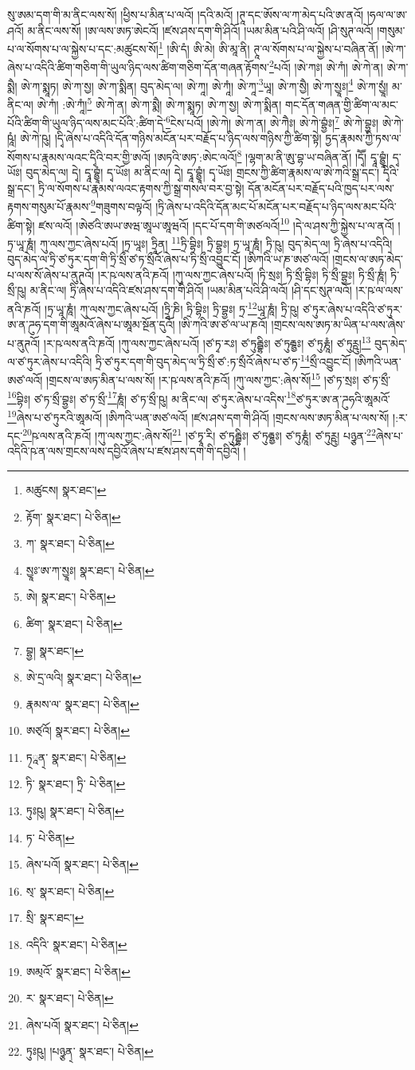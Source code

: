 སུ་ཨམ་དག་གི་མ་ནིང་ལས་སོ། །ཕྱིས་པ་མིན་པ་ལའོ། །དའི་མའོ། །ཊཱ་དང་ཨོས་ལ་ཀ་མེད་པའི་ཨ་ནའོ། །ཧལ་ལ་ཨ་ཤའོ། མ་ནིང་ལས་སོ། །ཨ་ལས་ཨཏ་ཨེངའོ། །ཛས་ཤས་དག་གི་ཤིའོ། །ཡམ་མིན་པའི་ཤི་ལའོ། །ཤི་སུཊ་ལའོ། །གསུམ་པ་ལ་སོགས་པ་ལ་སྐྱེས་པ་དང་:མཚུངས་སོ།\footnote{མཚུངས།  སྣར་ཐང་། } །ཨི་དཾ། ཨི་མེ། ཨི་མཱ་ནི། ཊཱ་ལ་སོགས་པ་ལ་སྐྱེས་པ་བཞིན་ནོ། །ཨེ་ཀ་ཞེས་པ་འདིའི་ཚིག་གཅིག་གི་ཡུལ་ཉིད་ལས་ཚིག་གཅིག་དོན་གཞན་རྟོགས་\footnote{རྟོག་  སྣར་ཐང་།  པེ་ཅིན། }པའོ། །ཨེ་ཀཿ། ཨེ་ཀཾ། ཨེ་ཀེ་ན། ཨེ་ཀ་སྨཻ། ཨེ་ཀ་སྨཱཏ། ཨེ་ཀ་སྱ། ཨེ་ཀ་སྨིན། བུད་མེད་ལ། ཨེ་ཀཱ། ཨེ་ཀཱཾ། ཨེ་ཀཱ་\footnote{ཀ་  སྣར་ཐང་།  པེ་ཅིན། }ཡཱ། ཨེ་ཀ་སྱཻ། ཨེ་ཀ་སྱཱཿ།\footnote{སྱཱཿ་ཨ་ཀ་སྱཱཿ།  སྣར་ཐང་།  པེ་ཅིན། } ཨེ་ཀ་སྱཱཾ། མ་ནིང་ལ། ཨེ་ཀཾ། :ཨེ་ཀཱཾ།\footnote{ཨེ།  སྣར་ཐང་།  པེ་ཅིན། } ཨེ་ཀེ་ན། ཨེ་ཀ་སྨཻ། ཨེ་ཀ་སྨཱཏ། ཨེ་ཀ་སྱ། ཨེ་ཀ་སྨིན། གང་དོན་གཞན་གྱི་ཚིག་ལ་མང་པོའི་ཚིག་གི་ཡུལ་ཉིད་ལས་མང་པོའི་:ཚིག་དེ་\footnote{ཚིག་  སྣར་ཐང་།  པེ་ཅིན། }ངེས་པའོ། །ཨེ་ཀེ། ཨེ་ཀ་ན། ཨེ་ཀཻཿ། ཨེ་ཀེ་བྷྱཾཿ།\footnote{བྷྱ།  སྣར་ཐང་། } ཨེ་ཀེ་བྷྱཿ། ཨེ་ཀེ་ཥཱཾ། ཨེ་ཀེ་ཥུ། །དྭི་ཞེས་པ་འདིའི་དོན་གཉིས་མངོན་པར་བརྗོད་པ་ཉིད་ལས་གཉིས་ཀྱི་ཚིག་སྟེ། ཏྱད་རྣམས་ཀྱི་ཏས་ལ་སོགས་པ་རྣམས་ལའང་དྭིའི་བར་གྱི་ཨའོ། །ཨཏའི་ཨཏ་:ཨེང་ལའོ།\footnote{ཨེ་དྲ་ལའི།  སྣར་ཐང་།  པེ་ཅིན། } །ལྷག་མ་ནི་ཨུ་བྷ་ཡ་བཞིན་ནོ། །དྭཽ། དྭཱ་བྷྱཱཾ། དྭ་ཡོཿ། བུད་མེད་ལ། དྭེ། དྭཱ་བྷྱཱཾ། དྭ་ཡོཿ། མ་ནིང་ལ། དྭེ། དྭཱ་བྷྱཱཾ། དྭ་ཡོཿ། གྲངས་ཀྱི་ཚིག་རྣམས་ལ་ཨེ་ཀའི་སྒྲ་དང་། དྭིའི་སྒྲ་དང་། ཏྲི་ལ་སོགས་པ་རྣམས་ལའང་རྟགས་ཀྱི་སྒྲ་གསལ་བར་བྱ་སྟེ། དོན་མངོན་པར་བརྗོད་པའི་ཁྱད་པར་ལས་རྟགས་གསུམ་པོ་རྣམས་\footnote{རྣམས་ལ་  སྣར་ཐང་།  པེ་ཅིན། }གཟུགས་བལྟའོ། །ཏྲི་ཞེས་པ་འདིའི་དོན་མང་པོ་མངོན་པར་བརྗོད་པ་ཉིད་ལས་མང་པོའི་ཚིག་སྟེ། ཛས་ལའོ། །ཨེཙའི་ཨཡ་ཨཝ་ཨཱཡ་ཨཱཝའོ། །དང་པོ་དག་གི་ཨཙལའོ།\footnote{ཨཙ྄འོ།  སྣར་ཐང་།  པེ་ཅིན། } །དེ་ལ་ཤས་ཀྱི་སྐྱེས་པ་ལ་ནའོ། །ཏྲ་ཡཱ་ཎཱཾ། ཀུ་ལས་ཀྱང་ཞེས་པའོ། །ཏྲ་ཡཱཿ། ཏྲཱིན། \footnote{ཏ྄ཱན྄་  སྣར་ཐང་།  པེ་ཅིན། }ཏྲི་བྷིཿ། ཏྲི་བྷྱཿ། ཏྲ་ཡཱ་ཎཱཾ། ཏྲི་ཥུ། བུད་མེད་ལ། ཏྲི་ཞེས་པ་འདིའི། བུད་མེད་ལ་ཏྲི་ཙ་ཏུར་དག་གི་ཏྲི་སྲྀ་ཙ་ཏ་སྲྀའོ་ཞེས་པ་ཏི་སྲྀ་འབྱུང་ངོ། །ཨིཀའི་ཡ་ཎ་ཨཙ་ལའོ། །གྲངས་ལ་ཨཏ་མེད་པ་ལས་སོ་ཞེས་པ་ནུཊའོ། །ར་ཥ་ལས་ནའི་ཎའོ། །ཀུ་ལས་ཀྱང་ཞེས་པའོ། །ཏི་སྲཿ། ཏི་སྲྀ་བྷིཿ། ཏི་སྲྀ་བྷྱཿ། ཏི་སྲྀ་ཎཱཾ། ཏི་སྲྀ་ཥུ། མ་ནིང་ལ། ཏྲི་ཞེས་པ་འདིའི་ཛས་ཤས་དག་གི་ཤིའོ། །ཡམ་མིན་པའི་ཤི་ལའོ། །ཤི་དང་སུཊ་ལའོ། །ར་ཥ་ལ་ལས་ནའི་ཎའོ། །ཏྲ་ཡཱ་ཎཱཾ། ཀུ་ལས་ཀྱང་ཞེས་པའོ། །ཏྲཱི་ཎི། ཏྲི་བྷིཿ། ཏྲི་བྷྱཿ། ཏྲ་\footnote{ཏི་  སྣར་ཐང་། ཏྲི་  པེ་ཅིན། }ཡཱ་ཎཱཾ། ཏྲི་ཥུ། ཙ་ཏུར་ཞེས་པ་འདིའི་ཙ་ཏུར་ཨ་ན་ཌུཧ་དག་གི་ཨཱམའོ་ཞེས་པ་ཨཱམ་སྔོན་དུའོ། །ཨི་ཀའི་ཨ་ཙ་ལ་ཡ་ཎའོ། །གྲངས་ལས་ཨཏ་མ་ཡིན་པ་ལས་ཞེས་པ་ནུཊའོ། །ར་ཥ་ལས་ནའི་ཎའོ། །ཀུ་ལས་ཀྱང་ཞེས་པའོ། །ཙ་ཏྭ་རཿ། ཙ་ཏུརྦྷིཿ། ཙ་ཏུརྦྷྱཿ། ཙ་ཏུརྞཱཾ། ཙ་ཏུཪྵུ།\footnote{ཏུཿཥུ།  སྣར་ཐང་།  པེ་ཅིན། } བུད་མེད་ལ་ཙ་ཏུར་ཞེས་པ་འདིའི། ཏྲི་ཙ་ཏུར་དག་གི་བུད་མེད་ལ་ཏྲི་སྲྀ་ཙ་:ཏ་སྲྀའོ་ཞེས་པ་ཙ་ཏ་\footnote{ཏ་  པེ་ཅིན། }སྲྀ་འབྱུང་ངོ། །ཨིཀའི་ཡན་ཨཙ་ལའོ། །གྲངས་ལ་ཨཏ་མིན་པ་ལས་སོ། །ར་ཥ་ལས་ནའི་ཎའོ། །ཀུ་ལས་ཀྱང་:ཞེས་སོ།\footnote{ཞེས་པའོ།  སྣར་ཐང་།  པེ་ཅིན། } །ཙ་ཏ་སྲཿ། ཙ་ཏ་སྲྀ་\footnote{ས྄་  སྣར་ཐང་།  པེ་ཅིན། }བྷིཿ། ཙ་ཏ་སྲྀ་བྷྱཿ། ཙ་ཏ་སྲྀ་\footnote{སྲི་  སྣར་ཐང་། }ཎཱཾ། ཙ་ཏ་སྲྀ་ཥུ། མ་ནིང་ལ། ཙ་ཏུར་ཞེས་པ་འདིས་\footnote{འདིའི་  སྣར་ཐང་།  པེ་ཅིན། }ཙ་ཏུར་ཨ་ན་ཌུཧའི་ཨཱམའོ་\footnote{ཨམ྄འོ་  སྣར་ཐང་།  པེ་ཅིན། }ཞེས་པ་ཙ་ཏུརའི་ཨཱམའོ། །ཨིཀའི་ཡན་ཨཙ་ལའོ། །ཛས་ཤས་དག་གི་ཤིའོ། །གྲངས་ལས་ཨཏ་མིན་པ་ལས་སོ། །:ར་དང་\footnote{ར་  སྣར་ཐང་།  པེ་ཅིན། }ཥ་ལས་ནའི་ཎའོ། །ཀུ་ལས་ཀྱང་:ཞེས་སོ།\footnote{ཞེས་པའོ།  སྣར་ཐང་།  པེ་ཅིན། } །ཙ་ཏྭཱ་རི། ཙ་ཏུརྦྷིཿ། ཙ་ཏུརྦྷྱཿ། ཙ་ཏུརྞཱཾ། ཙ་ཏུཪྵུ། པཉྩན་\footnote{ཏུཿཥུ། །པཉྩན྄་  སྣར་ཐང་།  པེ་ཅིན། }ཞེས་པ་འདིའི་ཥ་ན་ལས་གྲངས་ལས་དབྱིའོ་ཞེས་པ་ཛས་ཤས་དག་གི་དབྱིའོ། །
